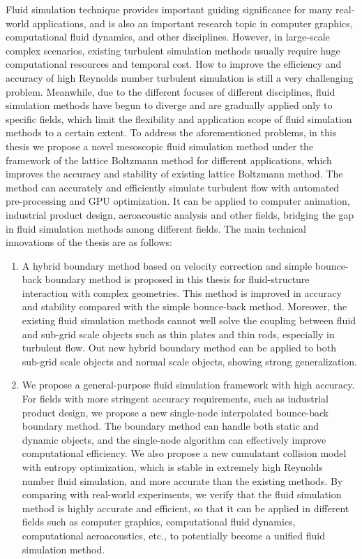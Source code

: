 \begin{abstract*}[flattitle]
  Fluid simulation technique provides important guiding significance for many real-world applications, and is also an important research topic in computer graphics, computational fluid dynamics, and other disciplines.
  However, in large-scale complex scenarios, existing turbulent simulation methods usually require huge computational resources and temporal cost.
  How to improve the efficiency and accuracy of high Reynolds number turbulent simulation is still a very challenging problem.
  Meanwhile, due to the different focuses of different disciplines, fluid simulation methods have begun to diverge and are gradually applied only to specific fields, which limit the flexibility and application scope of fluid simulation methods to a certain extent.
  To address the aforementioned problems, in this thesis we propose a novel mesoscopic fluid simulation method under the framework of the lattice Boltzmann method for different applications, which improves the accuracy and stability of existing lattice Boltzmann method. The method can accurately and efficiently simulate turbulent flow with automated pre-processing and GPU optimization. It can be applied to computer animation, industrial product design, aeroacoustic analysis and other fields, bridging the gap in fluid simulation methods among different fields. The main technical innovations of the thesis are as follows:
  \begin{enumerate}
    \item A hybrid boundary method based on velocity correction and simple bounce-back boundary method is proposed in this thesis for fluid-structure interaction with complex geometries. This method is improved in accuracy and stability compared with the simple bounce-back method. Moreover, the existing fluid simulation methods cannot well solve the coupling between fluid and sub-grid scale objects such as thin plates and thin rods, especially in turbulent flow. Out new hybrid boundary method can be applied to both sub-grid scale objects and normal scale objects, showing strong generalization.
    \item We propose a general-purpose fluid simulation framework with high accuracy. For fields with more stringent accuracy requirements, such as industrial product design, we propose a new single-node interpolated bounce-back boundary method. The boundary method can handle both static and dynamic objects, and the single-node algorithm can effectively improve computational efficiency. We also propose a new cumulatant collision model with entropy optimization, which is stable in extremely high Reynolds number fluid simulation, and more accurate than the existing methods. By comparing with real-world experiments, we verify that the fluid simulation method is highly accurate and efficient, so that it can be applied in different fields such as computer graphics, computational fluid dynamics, computational aeroacoustics, etc., to potentially become a unified fluid simulation method.

\end{enumerate}
\end{abstract*}
